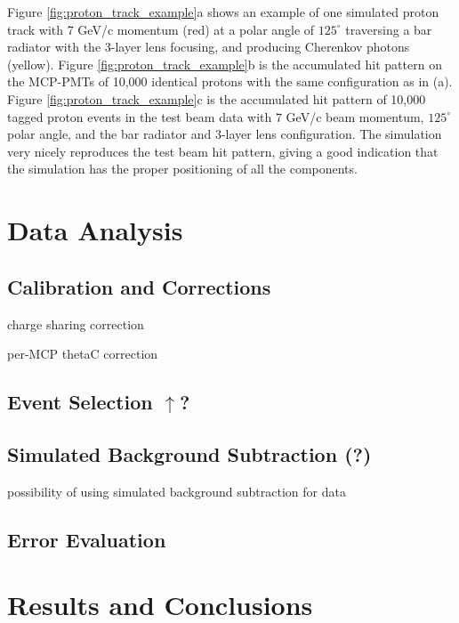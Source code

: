 Figure \ref{fig:proton_track_example}a shows an example of one simulated proton track with 7 GeV/c momentum (red) at a polar angle of $125^{\circ}$ traversing a bar radiator with the 3-layer lens focusing, and producing Cherenkov photons (yellow). Figure \ref{fig:proton_track_example}b is the accumulated hit pattern on the MCP-PMTs of 10,000 identical protons with the same configuration as in (a). Figure \ref{fig:proton_track_example}c is the accumulated hit pattern of 10,000 tagged proton events in the test beam data with 7 GeV/c beam momentum, $125^{\circ}$ polar angle, and the bar radiator and 3-layer lens configuration. The simulation very nicely reproduces the test beam hit pattern, giving a good indication that the simulation has the proper positioning of all the components.

\section{Data Analysis}

\subsection{Calibration and Corrections}
charge sharing correction

per-MCP thetaC correction

\subsection{Event Selection $\uparrow$?}

\subsection{Simulated Background Subtraction (?)}
possibility of using simulated background subtraction for data


\subsection{Error Evaluation}

\section{Results and Conclusions}